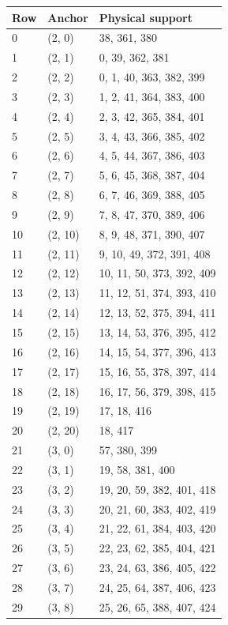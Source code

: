 \documentclass{article}
\begin{document}
\begin{longtable}{lll}
  Row & Anchor & Physical support \\
  \hline
  \endhead
  0 & (2, 0) & 38, 361, 380 \\
  1 & (2, 1) & 0, 39, 362, 381 \\
  2 & (2, 2) & 0, 1, 40, 363, 382, 399 \\
  3 & (2, 3) & 1, 2, 41, 364, 383, 400 \\
  4 & (2, 4) & 2, 3, 42, 365, 384, 401 \\
  5 & (2, 5) & 3, 4, 43, 366, 385, 402 \\
  6 & (2, 6) & 4, 5, 44, 367, 386, 403 \\
  7 & (2, 7) & 5, 6, 45, 368, 387, 404 \\
  8 & (2, 8) & 6, 7, 46, 369, 388, 405 \\
  9 & (2, 9) & 7, 8, 47, 370, 389, 406 \\
  10 & (2, 10) & 8, 9, 48, 371, 390, 407 \\
  11 & (2, 11) & 9, 10, 49, 372, 391, 408 \\
  12 & (2, 12) & 10, 11, 50, 373, 392, 409 \\
  13 & (2, 13) & 11, 12, 51, 374, 393, 410 \\
  14 & (2, 14) & 12, 13, 52, 375, 394, 411 \\
  15 & (2, 15) & 13, 14, 53, 376, 395, 412 \\
  16 & (2, 16) & 14, 15, 54, 377, 396, 413 \\
  17 & (2, 17) & 15, 16, 55, 378, 397, 414 \\
  18 & (2, 18) & 16, 17, 56, 379, 398, 415 \\
  19 & (2, 19) & 17, 18, 416 \\
  20 & (2, 20) & 18, 417 \\
  21 & (3, 0) & 57, 380, 399 \\
  22 & (3, 1) & 19, 58, 381, 400 \\
  23 & (3, 2) & 19, 20, 59, 382, 401, 418 \\
  24 & (3, 3) & 20, 21, 60, 383, 402, 419 \\
  25 & (3, 4) & 21, 22, 61, 384, 403, 420 \\
  26 & (3, 5) & 22, 23, 62, 385, 404, 421 \\
  27 & (3, 6) & 23, 24, 63, 386, 405, 422 \\
  28 & (3, 7) & 24, 25, 64, 387, 406, 423 \\
  29 & (3, 8) & 25, 26, 65, 388, 407, 424 \\

\end{longtable}
\end{document}
